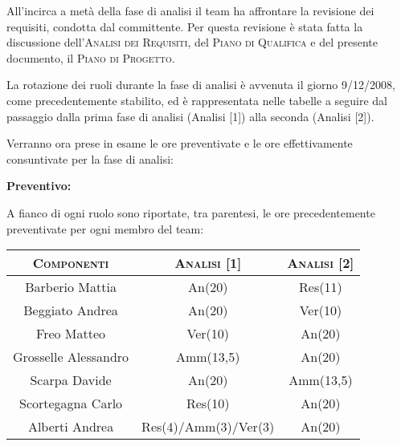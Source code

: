 \documentclass[11pt,a4paper]{article}
\begin{document}
All'incirca a metà della fase di analisi il team ha affrontare la revisione dei requisiti, condotta dal committente.
Per questa revisione è stata fatta la discussione dell'\textsc{Analisi dei Requisiti}, del \textsc{Piano di Qualifica} e del presente documento, il \textsc{Piano di Progetto}.

La rotazione dei ruoli durante la fase di analisi è avvenuta il giorno 9/12/2008, come precedentemente stabilito, ed è rappresentata nelle tabelle a seguire dal passaggio dalla prima fase di analisi (Analisi [1]) alla seconda (Analisi [2]).

Verranno ora prese in esame le ore preventivate e le ore effettivamente consuntivate per la fase di analisi:

\bigskip \bigskip
\begin{large}\textbf{Preventivo:}\end{large}
\newline
A fianco di ogni ruolo sono riportate, tra parentesi, le ore precedentemente preventivate per ogni membro del team:
\\
\begin{center}
\begin{tabular}{|c||c|c|}
\hline
\textsc{Componenti} & \textsc{Analisi [1]} & \textsc{Analisi [2]} \\ \hline \hline
Barberio Mattia & An(20) & Res(11) \\ \hline
Beggiato Andrea & An(20) & Ver(10) \\ \hline
Freo Matteo & Ver(10) & An(20) \\ \hline
Grosselle Alessandro & Amm(13,5) & An(20) \\ \hline
Scarpa Davide & An(20) & Amm(13,5) \\ \hline
Scortegagna Carlo & Res(10) & An(20) \\ \hline
Alberti Andrea & Res(4)/Amm(3)/Ver(3) & An(20) \\ \hline
\end{tabular}
\end{center}
\end{document}
